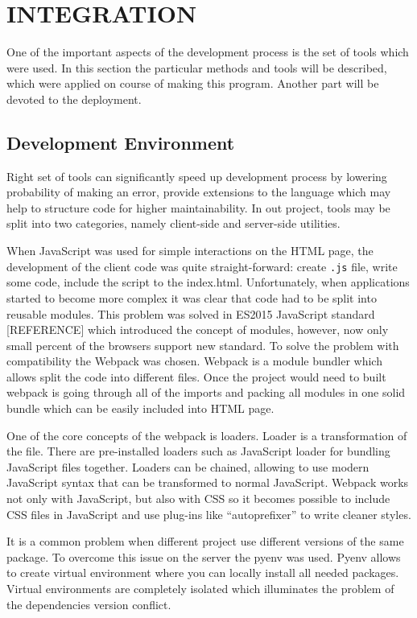 \section{INTEGRATION}

One of the important aspects of the development process is the set of tools which were
used. In this section the particular methods and tools will be described, which
were applied on course of making this program. Another part will be devoted to
the deployment.

\subsection{Development Environment}

Right set of tools can significantly speed up development process by lowering probability of making
an error, provide extensions to the language which may help to structure code for higher
maintainability. In out project, tools may be split into two categories, namely client-side and
server-side utilities.

When JavaScript was used for simple interactions on the HTML page, the development of the client
code was quite straight-forward: create \texttt{.js} file, write some code, include the script to
the index.html. Unfortunately, when applications started to become more complex it was clear that
code had to be split into reusable modules. This problem was solved in ES2015 JavaScript standard
[REFERENCE] which introduced the concept of modules, however, now only small percent of the browsers
support new standard. To solve the problem with compatibility the Webpack was chosen. Webpack is a
module bundler which allows split the code into different files. Once the project would need to
built webpack is going through all of the imports and packing all modules in one solid bundle which
can be easily included into HTML page.

One of the core concepts of the webpack is loaders. Loader is a transformation
of the file. There are pre-installed loaders such as JavaScript loader for
bundling JavaScript files together. Loaders can be chained, allowing to use modern
JavaScript syntax that can be transformed to normal JavaScript. Webpack
works not only with JavaScript, but also with CSS so it becomes possible to include
CSS files in JavaScript and use plug-ins like ``autoprefixer'' to write cleaner styles.

It is a common problem when different project use different versions of the same
package. To overcome this issue on the server the pyenv was used. Pyenv allows
to create virtual environment where you can locally install all needed packages. Virtual
environments are completely isolated which illuminates the problem of the dependencies version
conflict.

